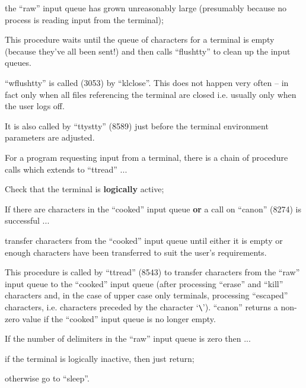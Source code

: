 \item[(b)] the ``raw'' input queue has grown
unreasonably large (presumably
because no process is reading
input from the terminal);
\ed


This procedure waits until the queue of
characters for a terminal is empty
(because they've all been sent!) and
then calls ``flushtty'' to clean up the
input queues.

``wflushtty'' is called (3053) by
``klclose''. This does not happen very
often -- in fact only when all files
referencing the terminal are closed
i.e. usually only when the user logs
off.

It is also called by ``ttystty'' (8589)
just before the terminal environment
parameters are adjusted.


For a program requesting input from a
terminal, there is a chain of procedure
calls which extends to ``ttread'' ...


\bd
\item[8541:] Check that the terminal is
{\bf logically} active;

\item[8543:] If there are characters in the
``cooked'' input queue {\bf or} a call on
``canon'' (8274) is successful ...

\item[8544:] transfer characters from the
``cooked'' input queue until either
it is empty or enough characters
have been transferred to suit the
user's requirements.
\ed


This procedure is called by ``ttread''
(8543) to transfer characters from the
``raw'' input queue to the ``cooked'' input
queue (after processing ``erase'' and
``kill'' characters and, in the case of
upper case only terminals, processing
``escaped'' characters, i.e. characters
preceded by the character `\verb+\+'). ``canon''
returns a non-zero value if the
``cooked'' input queue is no longer
empty.

\bd
\item[8284:] If the number of delimiters in
the ``raw'' input queue is zero
then ...

\item[8285:] if the terminal is logically
inactive, then just return;

\item[8286:] otherwise go to ``sleep''.
\ed

